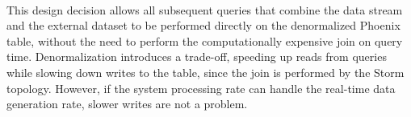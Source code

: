 \begin{table}[H]
\centering
{}
\quad
{}
\\
\caption{Denormalization example}
\label{table:denormalization_example}
\end{table}

This design decision allows all subsequent queries that combine the data stream and the external dataset to be performed directly on the denormalized Phoenix table, without the need to perform the computationally expensive join on query time. Denormalization introduces a trade-off, speeding up reads from queries while slowing down writes to the table, since the join is performed by the Storm topology. However, if the system processing rate can handle the real-time data generation rate, slower writes are not a problem.

